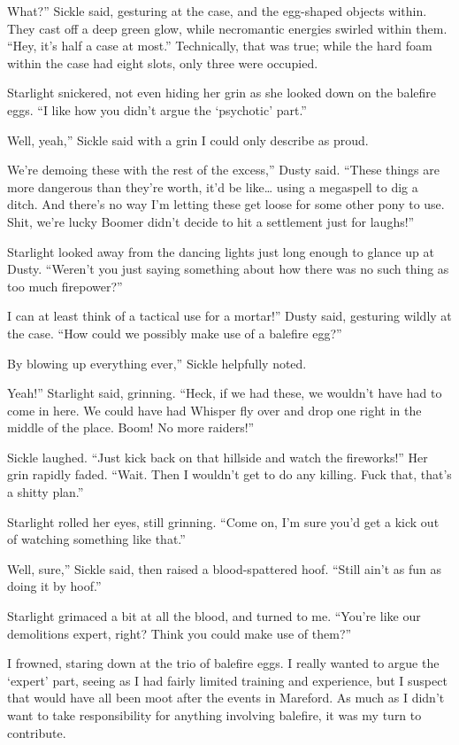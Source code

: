 \leavevmode{}What?” Sickle said, gesturing at the case, and the egg-shaped objects within. They cast off a deep green glow, while necromantic energies swirled within them. “Hey, it’s half a case at most.” Technically, that was true; while the hard foam within the case had eight slots, only three were occupied.

Starlight snickered, not even hiding her grin as she looked down on the balefire eggs. “I like how you didn’t argue the ‘psychotic’ part.”

\leavevmode{}Well, yeah,” Sickle said with a grin I could only describe as proud.

\leavevmode{}We’re demoing these with the rest of the excess,” Dusty said. “These things are more dangerous than they’re worth, it’d be like… using a megaspell to dig a ditch. And there’s no way I’m letting these get loose for some other pony to use. Shit, we’re lucky Boomer didn’t decide to hit a settlement just for laughs!”

Starlight looked away from the dancing lights just long enough to glance up at Dusty. “Weren’t you just saying something about how there was no such thing as too much firepower?”

\leavevmode{}I can at least think of a tactical use for a mortar!” Dusty said, gesturing wildly at the case. “How could we possibly make use of a balefire egg?”

\leavevmode{}By blowing up everything ever,” Sickle helpfully noted.

\leavevmode{}Yeah!” Starlight said, grinning. “Heck, if we had these, we wouldn’t have had to come in here. We could have had Whisper fly over and drop one right in the middle of the place. Boom! No more raiders!”

Sickle laughed. “Just kick back on that hillside and watch the fireworks!” Her grin rapidly faded. “Wait. Then I wouldn’t get to do any killing. Fuck that, that’s a shitty plan.”

Starlight rolled her eyes, still grinning. “Come on, I’m sure you’d get a kick out of watching something like that.”

\leavevmode{}Well, sure,” Sickle said, then raised a blood-spattered hoof. “Still ain’t as fun as doing it by hoof.”

Starlight grimaced a bit at all the blood, and turned to me. “You’re like our demolitions expert, right? Think you could make use of them?”

I frowned, staring down at the trio of balefire eggs. I really wanted to argue the ‘expert’ part, seeing as I had fairly limited training and experience, but I suspect that would have all been moot after the events in Mareford. As much as I didn’t want to take responsibility for anything involving balefire, it was my turn to contribute.


